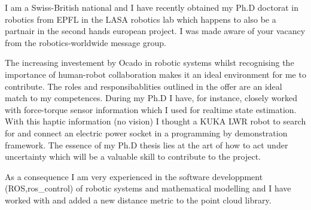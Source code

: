\documentclass[11pt, a4paper]{awesome-cv}
\begin{document}
\makecvheader

\makelettertitle

\begin{cvletter}


I am a Swiss-British national and I have recently obtained my Ph.D doctorat in robotics from 
EPFL in the LASA robotics lab  which happens to also be a partnair in the second hands european project.  
I was made aware of your vacancy from the robotics-worldwide message group. 



The increasing investement by Ocado in robotic systems whilst recognising the importance of 
human-robot collaboration makes it an ideal environment for me to contribute. The roles and 
responsibablities outlined in the offer are an ideal match to my competences. During my 
Ph.D I have, for instance, closely worked with force-torque sensor information which I used 
for realtime state estimation. With this haptic information (no vision) I thought a KUKA LWR 
robot to search for and connect an electric power socket in a programming by demonstration
framework. The essence of my Ph.D thesis lies at the art of how to act under uncertainty which 
will be a valuable skill to contribute to the project. 

As a consequence I am very experienced in the software developpment (ROS,ros\_control) of robotic 
systems and mathematical modelling and I have worked with and added a new distance metric to the point 
cloud library.




\end{cvletter}
\end{document}
